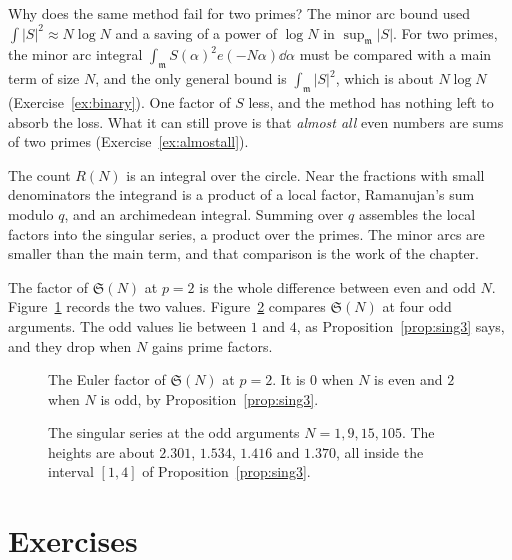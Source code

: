 \begin{think}
Why does the same method fail for two primes? The minor arc bound used $\int|S|^2\approx N\log N$ and a saving of a power of $\log N$ in $\sup_{\mathfrak m}|S|$. For two primes, the minor arc integral $\int_{\mathfrak m}S(\alpha)^2e(-N\alpha)\dd\alpha$ must be compared with a main term of size $N$, and the only general bound is $\int_{\mathfrak m}|S|^2$, which is about $N\log N$ (Exercise~\ref{ex:binary}). One factor of $S$ less, and the method has nothing left to absorb the loss. What it can still prove is that \emph{almost all} even numbers are sums of two primes (Exercise~\ref{ex:almostall}).
\end{think}

\begin{beauty}
The count $R(N)$ is an integral over the circle. Near the fractions with small denominators the integrand is a product of a local factor, Ramanujan's sum modulo $q$, and an archimedean integral. Summing over $q$ assembles the local factors into the singular series, a product over the primes. The minor arcs are smaller than the main term, and that comparison is the work of the chapter.
\end{beauty}

The factor of $\mathfrak S(N)$ at $p=2$ is the whole difference between even and odd $N$. Figure~\ref{fig:v14-extra-07-a} records the two values. Figure~\ref{fig:v14-extra-07-b} compares $\mathfrak S(N)$ at four odd arguments. The odd values lie between $1$ and $4$, as Proposition~\ref{prop:sing3} says, and they drop when $N$ gains prime factors.

\begin{figure}[ht]
\centering
{}
\caption{The Euler factor of $\mathfrak S(N)$ at $p=2$. It is $0$ when $N$ is even and $2$ when $N$ is odd, by Proposition~\ref{prop:sing3}.}
\label{fig:v14-extra-07-a}
\end{figure}

\begin{figure}[ht]
\centering
{}
\caption{The singular series at the odd arguments $N=1,9,15,105$. The heights are about $2.301$, $1.534$, $1.416$ and $1.370$, all inside the interval $[1,4]$ of Proposition~\ref{prop:sing3}.}
\label{fig:v14-extra-07-b}
\end{figure}

\section{Exercises}

